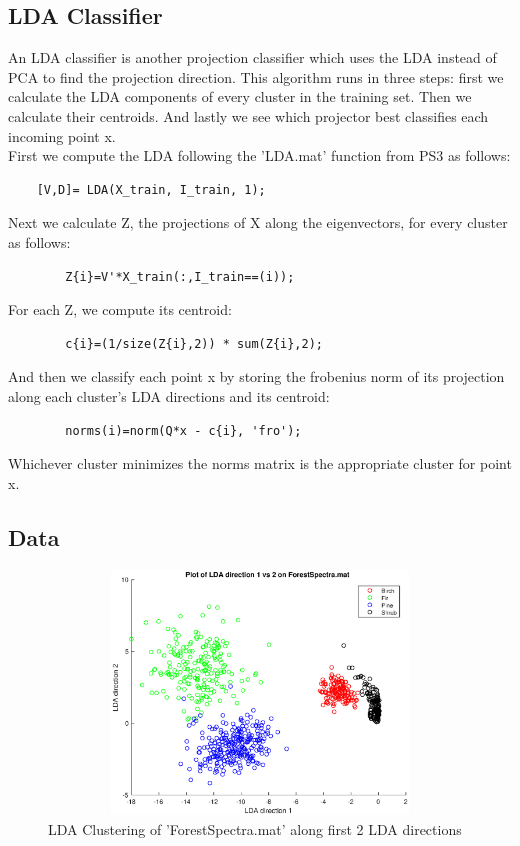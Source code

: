 \documentclass{article}
\begin{document}
\subsection*{LDA Classifier}
An LDA classifier is another projection classifier which uses the LDA instead of PCA to find the projection direction. This algorithm runs in three steps: first we calculate the LDA components of every cluster in the training set.  Then we calculate their centroids.  And lastly we see which projector best classifies each incoming point x. 
\\First we compute the LDA following the 'LDA.mat' function from PS3 as follows:
\begin{verbatim}
    [V,D]= LDA(X_train, I_train, 1);
\end{verbatim}
Next we calculate Z, the projections of X along the eigenvectors, for every cluster as follows:
\begin{verbatim}
        Z{i}=V'*X_train(:,I_train==(i));
\end{verbatim}
For each Z, we compute its centroid:
\begin{verbatim}
        c{i}=(1/size(Z{i},2)) * sum(Z{i},2);
\end{verbatim}
And then we classify each point x by storing the frobenius norm of its projection along each cluster's LDA directions and its centroid:
\begin{verbatim}
        norms(i)=norm(Q*x - c{i}, 'fro');
\end{verbatim}
Whichever cluster minimizes the norms matrix is the appropriate cluster for point x.


\subsection*{Data}
\begin{figure}[H]
    \centerline
    {
    \includegraphics[width=15cm, height=6.5cm]{Q3_2directions}
    }
    \caption{\label{fig:my figure} LDA Clustering of 'ForestSpectra.mat' along first 2 LDA directions }
\end{figure}
\end{document}
